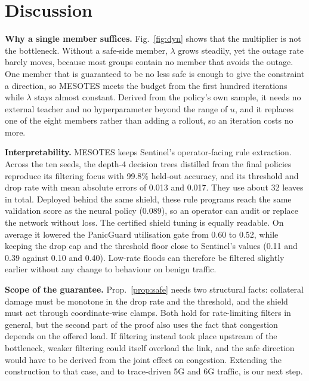 \documentclass[journal]{IEEEtran}
\begin{document}
\section{Discussion}
\textbf{Why a single member suffices.} Fig.~\ref{fig:dyn} shows that the multiplier is not the bottleneck. Without a safe-side member, $\lambda$ grows steadily, yet the outage rate barely moves, because most groups contain no member that avoids the outage. One member that is guaranteed to be no less safe is enough to give the constraint a direction, so MESOTES meets the budget from the first hundred iterations while $\lambda$ stays almost constant. Derived from the policy's own sample, it needs no external teacher and no hyperparameter beyond the range of $u$, and it replaces one of the eight members rather than adding a rollout, so an iteration costs no more.

\textbf{Interpretability.} MESOTES keeps Sentinel's operator-facing rule extraction. Across the ten seeds, the depth-4 decision trees distilled from the final policies reproduce its filtering focus with 99.8\% held-out accuracy, and its threshold and drop rate with mean absolute errors of 0.013 and 0.017. They use about 32 leaves in total. Deployed behind the same shield, these rule programs reach the same validation score as the neural policy (0.089), so an operator can audit or replace the network without loss. The certified shield tuning is equally readable. On average it lowered the PanicGuard utilisation gate from 0.60 to 0.52, while keeping the drop cap and the threshold floor close to Sentinel's values (0.11 and 0.39 against 0.10 and 0.40). Low-rate floods can therefore be filtered slightly earlier without any change to behaviour on benign traffic.

\textbf{Scope of the guarantee.} Prop.~\ref{prop:safe} needs two structural facts: collateral damage must be monotone in the drop rate and the threshold, and the shield must act through coordinate-wise clamps. Both hold for rate-limiting filters in general, but the second part of the proof also uses the fact that congestion depends on the offered load. If filtering instead took place upstream of the bottleneck, weaker filtering could itself overload the link, and the safe direction would have to be derived from the joint effect on congestion. Extending the construction to that case, and to trace-driven 5G and 6G traffic, is our next step.
\end{document}
